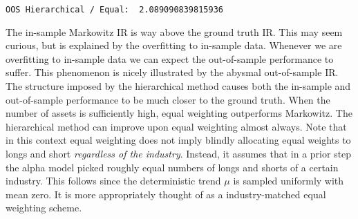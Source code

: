 \documentclass[11pt]{article}
\begin{document}
    \begin{Verbatim}[commandchars=\\\{\},fontsize=\footnotesize]
OOS Hierarchical / Equal:  2.089090839815936

    \end{Verbatim}

    The in-sample Markowitz IR is way above the ground truth IR. This may
seem curious, but is explained by the overfitting to in-sample data.
Whenever we are overfitting to in-sample data we can expect the
out-of-sample performance to suffer. This phenomenon is nicely
illustrated by the abysmal out-of-sample IR. The structure imposed by
the hierarchical method causes both the in-sample and out-of-sample
performance to be much closer to the ground truth. When the number of
assets is sufficiently high, equal weighting outperforms Markowitz. The
hierarchical method can improve upon equal weighting almost always. Note
that in this context equal weighting does not imply blindly allocating
equal weights to longs and short \emph{regardless of the industry}.
Instead, it assumes that in a prior step the alpha model picked roughly
equal numbers of longs and shorts of a certain industry. This follows
since the deterministic trend \(\mu\) is sampled uniformly with mean
zero. It is more appropriately thought of as a industry-matched equal
weighting scheme.
\end{document}
